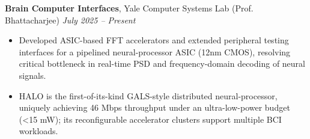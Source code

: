 \documentclass{article}
\begin{document}
\noindent\textbf{Brain Computer Interfaces}, Yale Computer Systems Lab (Prof. Bhattacharjee) \hfill \textit{July 2025 – Present} 
\begin{itemize}[noitemsep, topsep=1pt]
    \item{} Developed ASIC-based FFT accelerators and extended peripheral testing interfaces for a pipelined neural-processor ASIC (12nm CMOS), resolving critical bottleneck in real-time PSD and frequency-domain decoding of neural signals.
    \item{} HALO is the first-of-its-kind GALS-style distributed neural-processor, uniquely achieving 46 Mbps throughput under an ultra-low-power budget (<15 mW); its reconfigurable accelerator clusters support multiple BCI workloads.  

\end{itemize} \vspace{0.7ex}



\end{document}
